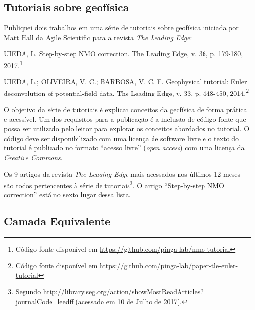 \subsection{Tutoriais sobre geofísica}

Publiquei dois trabalhos em uma série de tutoriais sobre geofísica iniciada por
Matt Hall da Agile Scientific \citep{hall_user_2016} para a revista \textit{The
Leading Edge}:

\begin{displayquote}
    UIEDA, L. Step-by-step NMO correction. The Leading Edge, v. 36, p.
    179-180, 2017.\footnote{Código fonte disponível em
    \url{https://github.com/pinga-lab/nmo-tutorial}}
\end{displayquote}

\begin{displayquote}
    UIEDA, L.; OLIVEIRA, V. C.; BARBOSA, V. C. F. Geophysical tutorial: Euler
    deconvolution of potential-field data. The Leading Edge, v. 33, p. 448-450,
    2014.\footnote{Código fonte disponível em
    \url{https://github.com/pinga-lab/paper-tle-euler-tutorial}}
\end{displayquote}

O objetivo da série de tutoriais é explicar conceitos da geofísica de forma
prática e acessível.
Um dos requisitos para a publicação é a inclusão de código fonte que possa ser
utilizado pelo leitor para explorar os conceitos abordados no tutorial.
O código deve ser disponibilizado com uma licença de software livre
e o texto do tutorial é publicado no formato ``acesso livre'' (\textit{open
access}) com uma licença da \textit{Creative Commons}.

Os 9 artigos da revista \textit{The Leading Edge} mais acessados nos últimos 12
meses são todos pertencentes à série de tutoriais\footnote{Segundo
\url{http://library.seg.org/action/showMostReadArticles?journalCode=leedff}
(acessado em 10 de Julho de 2017).}.
O artigo ``Step-by-step NMO correction'' está no sexto lugar dessa lista.



\subsection{Camada Equivalente}


